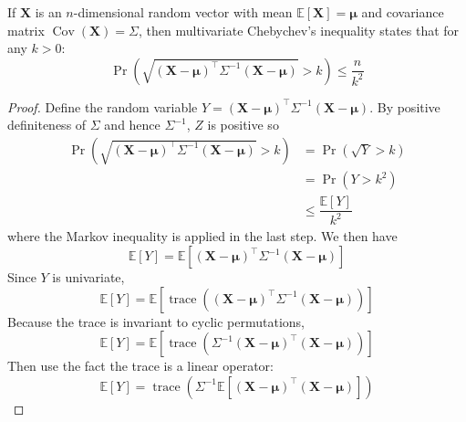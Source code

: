 \documentclass[11pt]{report} %
\begin{document}
If $\mathbf{X}$ is an $n$-dimensional random vector with mean $\mathbb{E}\left[\mathbf{X}\right] = \boldsymbol{\mu}$ and covariance matrix $\operatorname{Cov}\left(\mathbf{X}\right) = \Sigma$, then multivariate Chebychev's inequality states that for any $k > 0$:
\begin{equation}
\operatorname{Pr}\left(\sqrt{\left(\mathbf{X} - \boldsymbol{\mu}\right)^{\top}\Sigma^{-1}\left(\mathbf{X} - \boldsymbol{\mu}\right)} > k\right) \leq \dfrac{n}{k^{2}}
\end{equation}
\begin{proof}
Define the random variable $Y = \left(\mathbf{X} - \boldsymbol{\mu}\right)^{\top}\Sigma^{-1}\left(\mathbf{X} - \boldsymbol{\mu}\right)$. By positive definiteness of $\Sigma$ and hence $\Sigma^{-1}$, $Z$ is positive so
\begin{align}
\operatorname{Pr}\left(\sqrt{\left(\mathbf{X} - \boldsymbol{\mu}\right)^{\top}\Sigma^{-1}\left(\mathbf{X} - \boldsymbol{\mu}\right)} > k\right) &= \operatorname{Pr}\left(\sqrt{Y} > k\right) \\
&= \operatorname{Pr}\left(Y > k^{2}\right) \\
&\leq \dfrac{\mathbb{E}\left[Y\right]}{k^{2}}
\end{align}
where the Markov inequality is applied in the last step. We then have
\begin{equation}
\mathbb{E}\left[Y\right] = \mathbb{E}\left[\left(\mathbf{X} - \boldsymbol{\mu}\right)^{\top}\Sigma^{-1}\left(\mathbf{X} - \boldsymbol{\mu}\right)\right]
\end{equation}
Since $Y$ is univariate,
\begin{equation}
\mathbb{E}\left[Y\right] = \mathbb{E}\left[\operatorname{trace}\left(\left(\mathbf{X} - \boldsymbol{\mu}\right)^{\top}\Sigma^{-1}\left(\mathbf{X} - \boldsymbol{\mu}\right)\right)\right]
\end{equation}
Because the trace is invariant to cyclic permutations,
\begin{equation}
\mathbb{E}\left[Y\right] = \mathbb{E}\left[\operatorname{trace}\left(\Sigma^{-1}\left(\mathbf{X} - \boldsymbol{\mu}\right)^{\top}\left(\mathbf{X} - \boldsymbol{\mu}\right)\right)\right]
\end{equation}
Then use the fact the trace is a linear operator:
\begin{equation}
\mathbb{E}\left[Y\right] = \operatorname{trace}\left(\Sigma^{-1}\mathbb{E}\left[\left(\mathbf{X} - \boldsymbol{\mu}\right)^{\top}\left(\mathbf{X} - \boldsymbol{\mu}\right)\right]\right)
\end{equation}

\end{proof}
\end{document}
